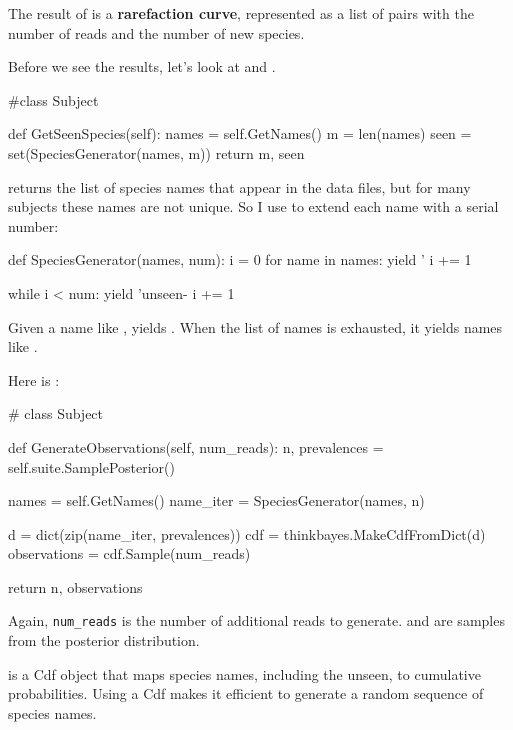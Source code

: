 \documentclass[12pt]{book}
\theoremstyle{exercise}
\begin{document}
The result of  is a {\bf rarefaction curve},
represented as a list of pairs with the number of reads and
the number of new species.

Before we see the results, let's look at  and
.

\begin{code}
#class Subject

    def GetSeenSpecies(self):
        names = self.GetNames()
        m = len(names)
        seen = set(SpeciesGenerator(names, m))
        return m, seen
\end{code}

 returns the list of species names that appear in
the data files, but for many subjects these names are not unique.
So I use  to extend each name with a serial
number:

\begin{code}
def SpeciesGenerator(names, num):
    i = 0
    for name in names:
        yield '%
        i += 1

    while i < num:
        yield 'unseen-%
        i += 1
\end{code}

Given a name like ,  yields
.  When the list of names is exhausted, it
yields names like .

Here is :

\begin{code}
# class Subject

    def GenerateObservations(self, num_reads):
        n, prevalences = self.suite.SamplePosterior()

        names = self.GetNames()
        name_iter = SpeciesGenerator(names, n)

        d = dict(zip(name_iter, prevalences))
        cdf = thinkbayes.MakeCdfFromDict(d)
        observations = cdf.Sample(num_reads)

        return n, observations
\end{code}

Again, \verb"num_reads" is the number of additional reads
to generate.   and  are samples from
the posterior distribution.

 is a Cdf object that maps species names, including the
unseen, to cumulative probabilities.  Using a Cdf makes it efficient
to generate a random sequence of species names.
\end{document}
